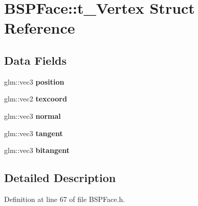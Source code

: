 \hypertarget{struct_b_s_p_face_1_1t___vertex}{}\section{B\+S\+P\+Face\+:\+:t\+\_\+\+Vertex Struct Reference}
\label{struct_b_s_p_face_1_1t___vertex}
\subsection*{Data Fields}
\begin{DoxyCompactItemize}
\item 
glm\+::vec3 {\bfseries position}\hypertarget{struct_b_s_p_face_1_1t___vertex_ac5788df4ea0a070da3f8e10f25d00d84}{}\label{struct_b_s_p_face_1_1t___vertex_ac5788df4ea0a070da3f8e10f25d00d84}

\item 
glm\+::vec2 {\bfseries texcoord}\hypertarget{struct_b_s_p_face_1_1t___vertex_ab2a87eb1a96455c38d53af01b865d8a2}{}\label{struct_b_s_p_face_1_1t___vertex_ab2a87eb1a96455c38d53af01b865d8a2}

\item 
glm\+::vec3 {\bfseries normal}\hypertarget{struct_b_s_p_face_1_1t___vertex_a6e4e4027290fe0cabadc113d6fe14d69}{}\label{struct_b_s_p_face_1_1t___vertex_a6e4e4027290fe0cabadc113d6fe14d69}

\item 
glm\+::vec3 {\bfseries tangent}\hypertarget{struct_b_s_p_face_1_1t___vertex_aa2e03a73d21b12407e8b5631cb2710dd}{}\label{struct_b_s_p_face_1_1t___vertex_aa2e03a73d21b12407e8b5631cb2710dd}

\item 
glm\+::vec3 {\bfseries bitangent}\hypertarget{struct_b_s_p_face_1_1t___vertex_a8ff282ef76172c94a812b7af1a10e602}{}\label{struct_b_s_p_face_1_1t___vertex_a8ff282ef76172c94a812b7af1a10e602}

\end{DoxyCompactItemize}


\subsection{Detailed Description}


Definition at line 67 of file B\+S\+P\+Face.\+h.

